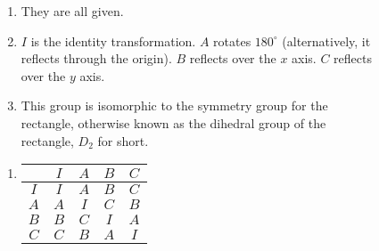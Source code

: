 \documentclass[../textbook.tex]{subfiles}
\begin{document}
\begin{figure}[h]
	\begin{center}
		\begin{minipage}[c]{0.55\textwidth}
			\begin{enumerate}[label=(\alph*)]
				\item They are all given.
				\item $I$ is the identity transformation. $A$ rotates $180^\circ$ (alternatively, it reflects through the origin). $B$ reflects over the $x$ axis. $C$ reflects over the $y$ axis.
				\setcounter{problem_i}{\value{enumi}}
				\addtocounter{enumi}{1} %
				\item This group is isomorphic to the symmetry group for the rectangle, otherwise known as the dihedral group of the rectangle, $D_2$ for short.
			\end{enumerate}
		\end{minipage}
		\hfill
		\begin{minipage}[c]{0.35\textwidth}
			\begin{enumerate}[label=(\alph*)]
				\setcounter{enumi}{\value{problem_i}}

				\centering
				\item\begin{tabular}{c|cccc}
					\hline
					& $I$ & $A$ & $B$ & $C$ \\ \hline
					\rowcolor{light-gray}
					$I$ & $I$ & $A$ & $B$ & $C$ \\
					$A$ & $A$ & $I$ & $C$ & $B$ \\
					\rowcolor{light-gray}
					$B$ & $B$ & $C$ & $I$ & $A$ \\
					$C$ & $C$ & $B$ & $A$ & $I$ \\ \hline
				\end{tabular}
			\end{enumerate}
		\end{minipage}
	\end{center}
	\vspace*{-1\baselineskip}
\end{figure}
\end{document}

